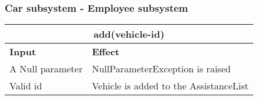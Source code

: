 \subsubsection{Car subsystem - Employee subsystem}
\begin{tabular}{|p{5cm}|p{7cm}|}
\hline
\multicolumn{2}{|c|}{add(vehicle-id)} \\
\hline
\textbf{Input} & \textbf{Effect} \\

\hline
A Null parameter & NullParameterException is raised \\

\hline
Valid id & Vehicle is added to the AssistanceList \\
\hline
\end{tabular}
\\